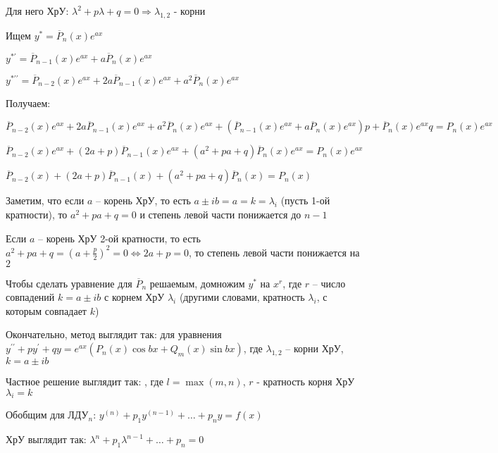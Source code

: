 \documentclass[12pt]{article}
\begin{document}
    Для него ХрУ: $\lambda^2 + p\lambda + q = 0 \Longrightarrow \lambda_{1,2}$ - корни

    Ищем $y^* = \overline{P}_n(x) e^{ax}$

    $y^{*\prime} = \overline{P}_{n - 1} (x) e^{ax} + a\overline{P}_n(x) e^{ax}$

    $y^{*\prime\prime} = \overline{P}_{n - 2} (x) e^{ax} + 2a\overline{P}_{n - 1} (x) e^{ax} + a^2\overline{P}_n(x) e^{ax}$

    Получаем:

    $\overline{P}_{n - 2} (x) e^{ax} + 2a\overline{P}_{n - 1} (x) e^{ax} + a^2\overline{P}_n(x) e^{ax} + (\overline{P}_{n - 1} (x) e^{ax} + a\overline{P}_n(x) e^{ax})p + \overline{P}_n(x) e^{ax} q = P_n(x) e^{ax}$

    $\overline{P}_{n - 2} (x) e^{ax} + (2a + p)\overline{P}_{n - 1} (x) e^{ax} + (a^2 + pa + q)\overline{P}_n(x) e^{ax} = P_n(x) e^{ax}$

    $\overline{P}_{n - 2} (x) + (2a + p)\overline{P}_{n - 1} (x) + (a^2 + pa + q)\overline{P}_n(x) = P_n(x)$

    \smallvspace

    Заметим, что если $a$ -- корень ХрУ, то есть $a \pm ib = a = k = \lambda_i$ (пусть 1-ой кратности), то $a^2 + pa + q = 0$ и степень
    левой части понижается до $n - 1$

    Если $a$ -- корень ХрУ 2-ой кратности, то есть $a^2 + pa + q = \left(a + \frac{p}{2}\right)^2 = 0 \Longleftrightarrow 2a + p = 0$, то степень левой части понижается на $2$

    Чтобы сделать уравнение для $\overline{P}_n$ решаемым, домножим $y^*$ на $x^r$, где $r$ -- число совпадений $k = a \pm ib$ с корнем ХрУ $\lambda_i$ (другими словами, кратность $\lambda_i$, с которым совпадает $k$)

    \mediumvspace

    Окончательно, метод выглядит так: для уравнения $y^{\prime\prime} + py^\prime + qy = e^{ax} (P_n(x)\cos bx + Q_m (x)\sin bx)$, где $\lambda_{1,2}$ -- корни ХрУ, $k = a \pm ib$

    Частное решение выглядит так: , где $l = \max(m, n)$, $r$ - кратность корня ХрУ $\lambda_i = k$

    \smallvspace

    Обобщим для ЛДУ$_n$: $y^{(n)} + p_1 y^{(n - 1)} + \dots + p_n y = f(x)$

    ХрУ выглядит так: $\lambda^n + p_1 \lambda^{n - 1} + \dots + p_n = 0$
\end{document}
